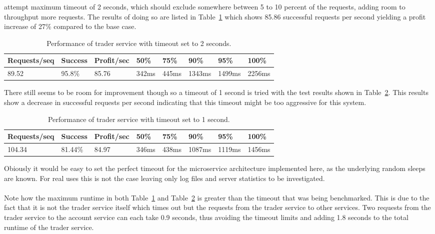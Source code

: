 attempt maximum timeout of 2 seconds, which should exclude somewhere
between 5 to 10 percent of the requests, adding room to throughput
more requests. The results of doing so are listed in
Table~\ref{table:timeouttest2sec} which shows 85.86 successful
requests per second yielding a profit increase of 27\% compared to the
base case.
\begin{table}[]
\centering
\caption{Performance of trader service with timeout set to 2 seconds.}
\label{table:timeouttest2sec}
\begin{tabular}{|l|l|l|l|l|l|l|l|}
\hline
Requests/seq & Success & Profit/sec & 50\% & 75\% & 90\% & 95\% & 100\% \\ \hline
89.52 & 95.8\% & 85.76 & 342ms & 445ms & 1343ms & 1499ms & 2256ms\\ \hline
\end{tabular}
\end{table}
There still seems to be room for improvement though so a timeout of 1
second is tried with the test results shown in
Table~\ref{table:timeouttest1sec}. This results show a decrease in
successful requests per second indicating that this timeout might be
too aggressive for this system.
\begin{table}[]
\centering
\caption{Performance of trader service with timeout set to 1 second.}
\label{table:timeouttest1sec}
\begin{tabular}{|l|l|l|l|l|l|l|l|}
\hline
Requests/seq & Success & Profit/sec & 50\% & 75\% & 90\% & 95\% & 100\% \\ \hline
104.34 & 81.44\% & 84.97 & 346ms & 438ms & 1087ms & 1119ms & 1456ms\\ \hline
\end{tabular}
\end{table}
Obiously it would be easy to set the perfect timeout for the
microservice architecture implemented here, as the underlying random
sleeps are known. For real uses this is not the case leaving only log
files and server statistics to be investigated.
\\\\
Note how the maximum runtime in both Table~\ref{table:timeouttest2sec}
and Table~\ref{table:timeouttest1sec} is greater than the timeout that
was being benchmarked. This is due to the fact that it is not the
trader service itself which times out but the requests from the trader
service to other services. Two requests from the trader service to the
account service can each take 0.9 seconds, thus avoiding the timeout
limits and adding 1.8 seconds to the total runtime of the trader service.


